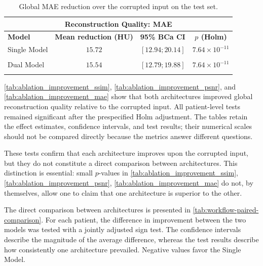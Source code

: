 \begin{table}[htbp]
\centering
\small
\begin{tabular}{lccc}
\multicolumn{4}{c}{\textbf{Reconstruction Quality: MAE}} \\[3pt]
\toprule
\textbf{Model} & \textbf{Mean reduction (HU)} & \textbf{95\% BCa CI} & \textbf{$p$ (Holm)} \\
\midrule
Single Model & $15.72$ & $[12.94; 20.14]$ & $7.64\times10^{-11}$ \\\\
Dual Model & $15.54$ & $[12.79; 19.88]$ & $7.64\times10^{-11}$ \\\\
\bottomrule
\end{tabular}
\captionsetup{skip=2pt}
\caption[MAE reduction over corrupted input]{Global MAE reduction over the corrupted input on the test set.}
\label{tab:ablation_improvement_mae}
\end{table}
\FloatBarrier

\autoref{tab:ablation_improvement_ssim}, \autoref{tab:ablation_improvement_psnr}, and \autoref{tab:ablation_improvement_mae} show that both architectures improved global reconstruction quality relative to the corrupted input. All patient-level tests remained significant after the prespecified Holm adjustment. The tables retain the effect estimates, confidence intervals, and test results; their numerical scales should not be compared directly because the metrics answer different questions.

These tests confirm that each architecture improves upon the corrupted input, but they do not constitute a direct comparison between architectures. This distinction is essential: small $p$-values in \autoref{tab:ablation_improvement_ssim}, \autoref{tab:ablation_improvement_psnr}, \autoref{tab:ablation_improvement_mae} do not, by themselves, allow one to claim that one architecture is superior to the other.

The direct comparison between architectures is presented in \autoref{tab:workflow-paired-comparison}. For each patient, the difference in improvement between the two models was tested with a jointly adjusted sign test. The confidence intervals describe the magnitude of the average difference, whereas the test results describe how consistently one architecture prevailed. Negative values favor the Single Model.

